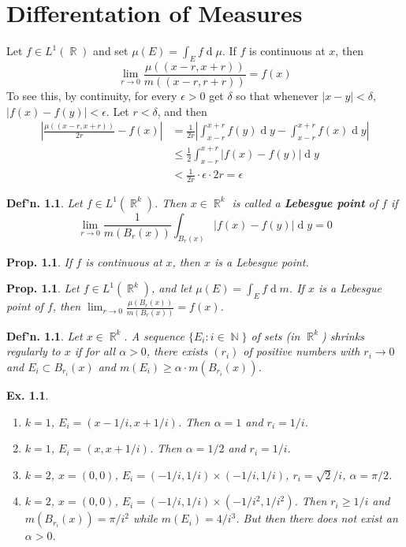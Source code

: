 \documentclass[12pt, a4paper]{book}
\DeclareMathOperator{\N}{\mathbb{N}}
\DeclareMathOperator{\R}{\mathbb{R}}
\renewcommand{\d}[1]{\ensuremath{\operatorname{d}\!{#1}}} %
\newtheorem{definition}[theorem]{Def'n.}
\newtheorem{proposition}[theorem]{Prop.}
\newtheorem{example}[theorem]{Ex.}
\theoremstyle{nonumberplain}
\begin{document}
\chapter{Differentation of Measures}
Let $f\in L^1(\R)$ and set $\mu(E)=\int_E f\d{\mu}$.
If $f$ is continuous at $x$, then
\[\lim_{r\to 0}\frac{\mu((x-r,x+r))}{m((x-r,r+r))}=f(x)\]
To see this, by continuity, for every $\epsilon>0$ get $\delta$ so that whenever $|x-y|<\delta$, $|f(x)-f(y)|<\epsilon$.
Let $r<\delta$, and then
\begin{align*}
    \left\lvert\frac{\mu((x-r,x+r))}{2r}-f(x)\right\rvert &= \frac{1}{2r}\left\lvert\int_{x-r}^{x+r} f(y)\d{y}-\int_{x-r}^{x+r}f(x)\d{y}\right\rvert\\
                                                          &\leq \frac{1}{2}\int_{x-r}^{x+r}|f(x)-f(y)|\d{y}\\
                                                          &< \frac{1}{2r} \cdot \epsilon\cdot 2r=\epsilon
\end{align*}
\begin{definition}
    Let $f\in L^1(\R^k)$.
    Then $x\in\R^k$ is called a \textbf{Lebesgue point} of $f$ if
    \[\lim_{r\to 0}\frac{1}{m(B_r(x))}\int_{B_r(x)}|f(x)-f(y)|\d{y}=0\]
\end{definition}
\begin{proposition}
    If $f$ is continuous at $x$, then $x$ is a Lebesgue point.
\end{proposition}
\begin{proposition}
    Let $f\in L^1(\R^k)$, and let $\mu(E)=\int_E f\d{m}$.
    If $x$ is a Lebesgue point of $f$, then $\lim_{r\to 0}\frac{\mu(B_r(x))}{m(B_r(x))}=f(x)$.
\end{proposition}
\begin{definition}
    Let $x\in\R^k$.
    A sequence $\{E_i:i\in\N\}$ of sets (in $\R^k$) shrinks regularly to $x$ if for all $\alpha>0$, there exists $(r_i)$ of positive numbers with $r_i\to 0$ and $E_i\subset B_{r_i}(x)$ and $m(E_i)\geq\alpha\cdot m(B_{r_i}(x))$.
\end{definition}
\begin{example}
    \begin{enumerate}[nolistsep]
        \item $k=1$, $E_i=(x-1/i,x+1/i)$.
            Then $\alpha=1$ and $r_i=1/i$.
        \item $k=1$, $E_i=(x,x+1/i)$.
            Then $\alpha=1/2$ and $r_i=1/i$.
        \item $k=2$, $x=(0,0)$, $E_i=(-1/i,1/i)\times(-1/i,1/i)$, $r_i=\sqrt{2}/i$, $\alpha=\pi/2$.
        \item $k=2$, $x=(0,0)$, $E_i=(-1/i,1/i)\times(-1/i^2,1/i^2)$.
            Then $r_i\geq 1/i$ and $m(B_{r_i}(x))=\pi/i^2$ while $m(E_i)=4/i^3$.
            But then there does not exist an $\alpha>0$.
    \end{enumerate}
\end{example}
\end{document}
